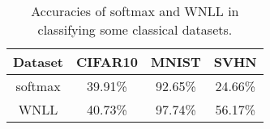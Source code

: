 \documentclass{article}
\begin{document}


\begin{table}[!h]
\renewcommand{\arraystretch}{1.3}
\centering
\caption{Accuracies of softmax and WNLL in classifying some classical datasets.}
\label{Simple-Classifiers}
\centering
\begin{tabular}{cccc}
\hline
\footnotesize{Dataset} & \footnotesize{CIFAR10} & \footnotesize{MNIST} & \footnotesize{SVHN}\\
\hline
softmax & 39.91\%  & 92.65\%   & 24.66\% \\
WNLL    & 40.73\%  & 97.74\%   & 56.17\% \\
\hline
\end{tabular}
\end{table}
\end{document}
